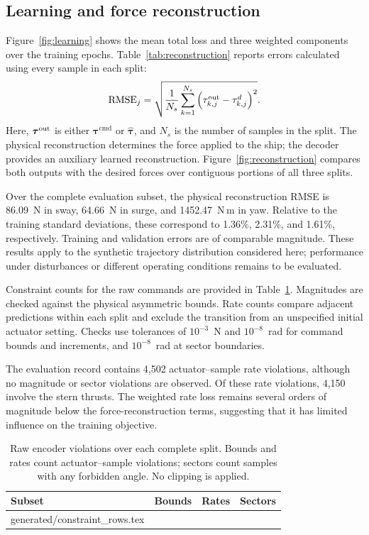 \documentclass[conference]{IEEEtran}
\makeatletter
\newcommand{\tauc}{\bm{\tau}^{\mathrm{cmd}}}
\newcommand{\tauh}{\hat{\bm{\tau}}}
\let\inputtable\@@input
\makeatother
\begin{document}
\subsection{Learning and force reconstruction}
Figure~\ref{fig:learning} shows the mean total loss and three weighted
components over the training epochs. Table~\ref{tab:reconstruction}
reports errors calculated using every sample in each split:
\begin{equation}
 \mathrm{RMSE}_j=\sqrt{\frac{1}{N_s}\sum_{k=1}^{N_s}
       \left(\tau^{\rm out}_{k,j}-\tau^d_{k,j}\right)^2}.
 \label{eq:rmse}
\end{equation}
Here, $\bm\tau^{\rm out}$ is either $\tauc$ or $\tauh$, and $N_s$ is the
number of samples in the split. The physical reconstruction determines
the force applied to the ship; the decoder provides an auxiliary learned
reconstruction. Figure~\ref{fig:reconstruction} compares both outputs
with the desired forces over contiguous portions of all three splits.

Over the complete evaluation subset, the physical reconstruction RMSE
is 86.09~N in sway, 64.66~N in surge, and 1452.47~N\,m in yaw.
Relative to the training standard deviations, these correspond to
1.36\%, 2.31\%, and 1.61\%, respectively. Training and validation errors
are of comparable magnitude. These results apply to the synthetic
trajectory distribution considered here; performance under disturbances
or different operating conditions remains to be evaluated.


Constraint counts for the raw commands are provided in
Table~\ref{tab:offlineconstraints}. Magnitudes are checked against the
physical asymmetric bounds. Rate counts compare adjacent predictions
within each split and exclude the transition from an unspecified initial
actuator setting. Checks use tolerances of $10^{-3}$~N and $10^{-8}$~rad
for command bounds and increments, and $10^{-8}$~rad at sector boundaries.

The evaluation record contains 4,502 actuator--sample rate violations,
although no magnitude or sector violations are observed. Of these rate
violations, 4,150 involve the stern thrusts. The weighted rate loss remains
several orders of magnitude below the force-reconstruction terms,
suggesting that it has limited influence on the training objective.

\begin{table}[t]
\caption{Raw encoder violations over each complete split. Bounds and rates
count actuator--sample violations; sectors count samples with any forbidden
angle. No clipping is applied.}
\label{tab:offlineconstraints}
\centering
\begin{tabular}{lrrr}
\toprule
Subset&Bounds&Rates&Sectors\\
\midrule
\inputtable generated/constraint_rows.tex
\bottomrule
\end{tabular}
\end{table}
\end{document}
